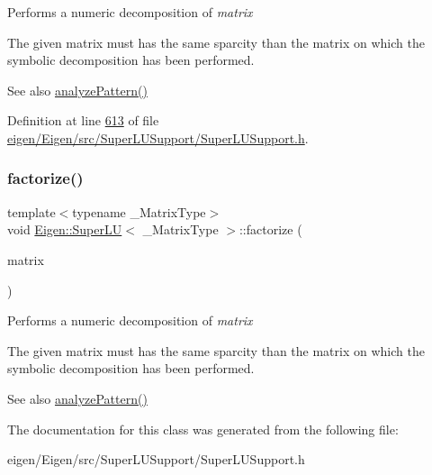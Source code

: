 Performs a numeric decomposition of {\itshape matrix} 

The given matrix must has the same sparcity than the matrix on which the symbolic decomposition has been performed.

\begin{DoxySeeAlso}{See also}
\hyperlink{class_eigen_1_1_super_l_u_a493cdfada27415a6037b004ff974eace}{analyze\+Pattern()} 
\end{DoxySeeAlso}


Definition at line \hyperlink{eigen_2_eigen_2src_2_super_l_u_support_2_super_l_u_support_8h_source_l00613}{613} of file \hyperlink{eigen_2_eigen_2src_2_super_l_u_support_2_super_l_u_support_8h_source}{eigen/\+Eigen/src/\+Super\+L\+U\+Support/\+Super\+L\+U\+Support.\+h}.

\mbox{\label{class_eigen_1_1_super_l_u_aa99bc43337da4a4628599cd5169566c4}} 
\subsubsection{\texorpdfstring{factorize()}{factorize()}\hspace{0.1cm}{\footnotesize\ttfamily [2/2]}}
{\footnotesize\ttfamily template$<$typename \+\_\+\+Matrix\+Type$>$ \\
void \hyperlink{class_eigen_1_1_super_l_u}{Eigen\+::\+Super\+LU}$<$ \+\_\+\+Matrix\+Type $>$\+::factorize (\begin{DoxyParamCaption}\item[{const Matrix\+Type \&}]{matrix }\end{DoxyParamCaption})}

Performs a numeric decomposition of {\itshape matrix} 

The given matrix must has the same sparcity than the matrix on which the symbolic decomposition has been performed.

\begin{DoxySeeAlso}{See also}
\hyperlink{class_eigen_1_1_super_l_u_a493cdfada27415a6037b004ff974eace}{analyze\+Pattern()} 
\end{DoxySeeAlso}


The documentation for this class was generated from the following file\+:\begin{DoxyCompactItemize}
\item 
eigen/\+Eigen/src/\+Super\+L\+U\+Support/\+Super\+L\+U\+Support.\+h\end{DoxyCompactItemize}
